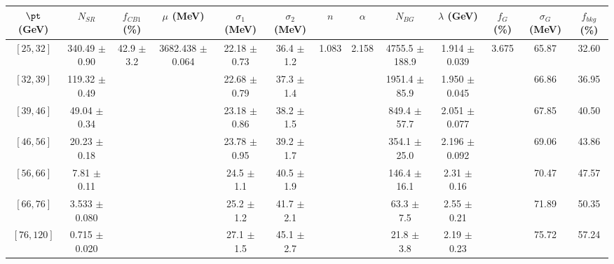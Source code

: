 \begin{tabular}{c||c|c|c|c|c|c|c|c|c|c|c||c}
$\pt$ (GeV) & $N_{SR}$ & $f_{CB1}$ (\%) & $\mu$ (MeV) & $\sigma_1$ (MeV) & $\sigma_2$ (MeV) & $n$ & $\alpha$ & $N_{BG}$ & $\lambda$ (GeV) & $f_G$ (\%) & $\sigma_G$ (MeV) & $f_{bkg}$ (\%) \\
\hline
$[25, 32]$ & 340.49 $\pm$ 0.90 & \multirow{7}{*}{42.9 $\pm$ 3.2} & \multirow{7}{*}{3682.438 $\pm$ 0.064} & 22.18 $\pm$ 0.73 & 36.4 $\pm$ 1.2 & \multirow{7}{*}{1.083} & \multirow{7}{*}{2.158} & 4755.5 $\pm$ 188.9 & 1.914 $\pm$ 0.039 & \multirow{7}{*}{3.675} & 65.87 & 32.60\\
$[32, 39]$ & 119.32 $\pm$ 0.49 &  &  & 22.68 $\pm$ 0.79 & 37.3 $\pm$ 1.4 &  &  & 1951.4 $\pm$ 85.9 & 1.950 $\pm$ 0.045 &  & 66.86 & 36.95\\
$[39, 46]$ & 49.04 $\pm$ 0.34 &  &  & 23.18 $\pm$ 0.86 & 38.2 $\pm$ 1.5 &  &  & 849.4 $\pm$ 57.7 & 2.051 $\pm$ 0.077 &  & 67.85 & 40.50\\
$[46, 56]$ & 20.23 $\pm$ 0.18 &  &  & 23.78 $\pm$ 0.95 & 39.2 $\pm$ 1.7 &  &  & 354.1 $\pm$ 25.0 & 2.196 $\pm$ 0.092 &  & 69.06 & 43.86\\
$[56, 66]$ & 7.81 $\pm$ 0.11 &  &  & 24.5 $\pm$ 1.1 & 40.5 $\pm$ 1.9 &  &  & 146.4 $\pm$ 16.1 & 2.31 $\pm$ 0.16 &  & 70.47 & 47.57\\
$[66, 76]$ & 3.533 $\pm$ 0.080 &  &  & 25.2 $\pm$ 1.2 & 41.7 $\pm$ 2.1 &  &  & 63.3 $\pm$ 7.5 & 2.55 $\pm$ 0.21 &  & 71.89 & 50.35\\
$[76, 120]$ & 0.715 $\pm$ 0.020 &  &  & 27.1 $\pm$ 1.5 & 45.1 $\pm$ 2.7 &  &  & 21.8 $\pm$ 3.8 & 2.19 $\pm$ 0.23 &  & 75.72 & 57.24\\
\end{tabular}
